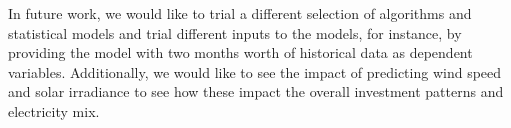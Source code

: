 In future work, we would like to trial a different selection of algorithms and statistical models and trial different inputs to the models, for instance, by providing the model with two months worth of historical data as dependent variables. Additionally, we would like to see the impact of predicting wind speed and solar irradiance to see how these impact the overall investment patterns and electricity mix. 
